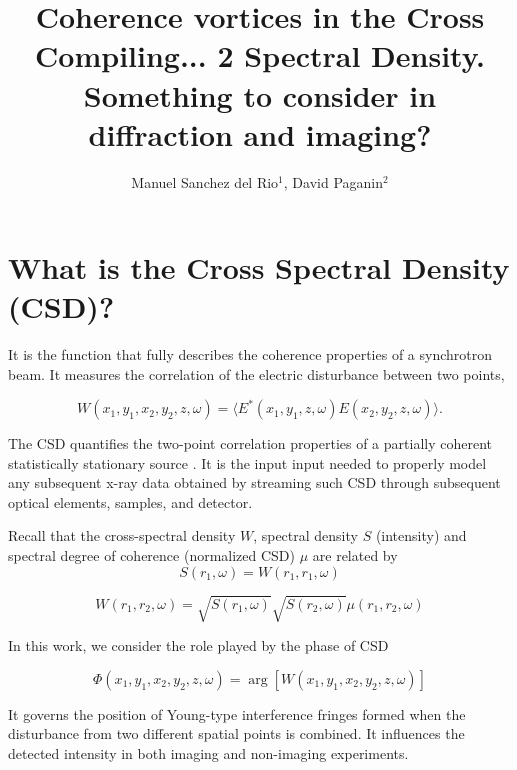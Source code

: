 \documentclass[a4paper,10pt]{article}
\title{Coherence vortices in the Cross
  Compiling...
2
 Spectral Density. Something to consider in diffraction and imaging?}
\author{Manuel Sanchez del Rio$^1$, David Paganin$^2$}
\begin{document}
\maketitle

\begin{abstract}

\end{abstract}

\section{What is the Cross Spectral Density (CSD)?}

It is the function that fully describes the coherence properties of a synchrotron beam. It measures the correlation of the electric disturbance between two points,

\begin{equation}
W(x_1,y_1,x_2,y_2,z,\omega) = 
\langle E^{*}(x_1,y_1,z,\omega) E(x_2,y_2,z,\omega)\rangle.
\end{equation}

The CSD quantifies the two-point correlation properties of a partially coherent statistically stationary source \cite{mandel_wolf}. 
It is the input input needed to properly model any subsequent x-ray data obtained by streaming such CSD through subsequent optical elements, samples, and detector.

Recall that the cross-spectral density $W$, spectral density $S$ (intensity) and spectral degree of coherence (normalized CSD) $\mu$ are related by 
\begin{equation}
S(r_1,\omega) = W(r_1,r_1,\omega) 
\end{equation}

\begin{equation}
W(r_1,r_2,\omega)=\sqrt{S(r_1,\omega)}\sqrt{S(r_2,\omega)}\mu(r_1,r_2,\omega)
\end{equation}

In this work, we consider the role played by the phase of CSD

\begin{equation}\label{phase_of_W}
\Phi(x_1,y_1,x_2,y_2,z,\omega)=\arg[W(x_1,y_1,x_2,y_2,z,\omega)]
\end{equation}

It governs the position of Young-type interference fringes formed when the disturbance from two different spatial points is combined. It influences the detected intensity in both imaging and non-imaging experiments.
\end{document}
